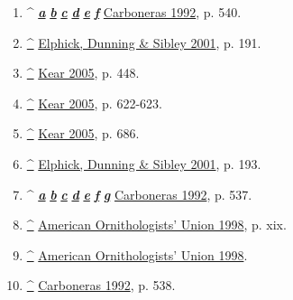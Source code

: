 \documentclass[11pt,a4paper]{article}
\begin{document}
\begin{enumerate}
\item \textasciicircum{} \href{\#cite\_ref-FOOTNOTECarboneras1992540\_9-0}{\textit{\textbf{a}}} \href{\#cite\_ref-FOOTNOTECarboneras1992540\_9-1}{\textit{\textbf{b}}} \href{\#cite\_ref-FOOTNOTECarboneras1992540\_9-2}{\textit{\textbf{c}}} \href{\#cite\_ref-FOOTNOTECarboneras1992540\_9-3}{\textit{\textbf{d}}} \href{\#cite\_ref-FOOTNOTECarboneras1992540\_9-4}{\textit{\textbf{e}}} \href{\#cite\_ref-FOOTNOTECarboneras1992540\_9-5}{\textit{\textbf{f}}} \href{\#CITEREFCarboneras1992}{Carboneras 1992}, p. 540.
\item \href{\#cite\_ref-FOOTNOTEElphickDunningSibley2001191\_10-0}{\textbf{\textasciicircum{}}} \href{\#CITEREFElphickDunningSibley2001}{Elphick, Dunning \& Sibley 2001}, p. 191.
\item \href{\#cite\_ref-FOOTNOTEKear2005448\_11-0}{\textbf{\textasciicircum{}}} \href{\#CITEREFKear2005}{Kear 2005}, p. 448.
\item \href{\#cite\_ref-FOOTNOTEKear2005622–623\_12-0}{\textbf{\textasciicircum{}}} \href{\#CITEREFKear2005}{Kear 2005}, p. 622-623.
\item \href{\#cite\_ref-FOOTNOTEKear2005686\_13-0}{\textbf{\textasciicircum{}}} \href{\#CITEREFKear2005}{Kear 2005}, p. 686.
\item \href{\#cite\_ref-FOOTNOTEElphickDunningSibley2001193\_14-0}{\textbf{\textasciicircum{}}} \href{\#CITEREFElphickDunningSibley2001}{Elphick, Dunning \& Sibley 2001}, p. 193.
\item \textasciicircum{} \href{\#cite\_ref-FOOTNOTECarboneras1992537\_15-0}{\textit{\textbf{a}}} \href{\#cite\_ref-FOOTNOTECarboneras1992537\_15-1}{\textit{\textbf{b}}} \href{\#cite\_ref-FOOTNOTECarboneras1992537\_15-2}{\textit{\textbf{c}}} \href{\#cite\_ref-FOOTNOTECarboneras1992537\_15-3}{\textit{\textbf{d}}} \href{\#cite\_ref-FOOTNOTECarboneras1992537\_15-4}{\textit{\textbf{e}}} \href{\#cite\_ref-FOOTNOTECarboneras1992537\_15-5}{\textit{\textbf{f}}} \href{\#cite\_ref-FOOTNOTECarboneras1992537\_15-6}{\textit{\textbf{g}}} \href{\#CITEREFCarboneras1992}{Carboneras 1992}, p. 537.
\item \href{\#cite\_ref-FOOTNOTEAmerican\_Ornithologists'\_Union1998xix\_16-0}{\textbf{\textasciicircum{}}} \href{\#CITEREFAmerican\_Ornithologists'\_Union1998}{American Ornithologists' Union 1998}, p. xix.
\item \href{\#cite\_ref-FOOTNOTEAmerican\_Ornithologists'\_Union1998\_17-0}{\textbf{\textasciicircum{}}} \href{\#CITEREFAmerican\_Ornithologists'\_Union1998}{American Ornithologists' Union 1998}.
\item \href{\#cite\_ref-FOOTNOTECarboneras1992538\_18-0}{\textbf{\textasciicircum{}}} \href{\#CITEREFCarboneras1992}{Carboneras 1992}, p. 538.

\end{enumerate}
\end{document}

